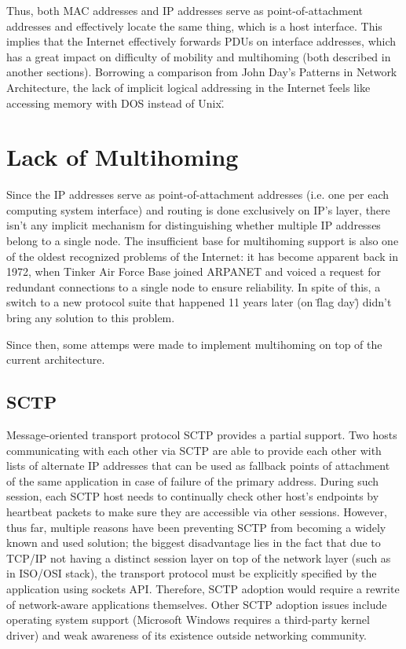         Thus, both MAC addresses and IP addresses serve as point-of-attachment addresses and effectively locate the same thing, which is a host interface. This implies that the Internet effectively forwards PDUs on interface addresses, which has a great impact on difficulty of mobility and multihoming (both described in another sections). Borrowing a comparison from John Day's Patterns in Network Architecture, the lack of implicit logical addressing in the Internet \"feels like accessing memory with DOS instead of Unix\".

    \section{Lack of Multihoming}

        Since the IP addresses serve as point-of-attachment addresses (i.e. one per each computing system interface) and routing is done exclusively on IP's layer, there isn't any implicit mechanism for distinguishing whether multiple IP addresses belong to a single node. The insufficient base for multihoming support is also one of the oldest recognized problems of the Internet: it has become apparent back in 1972, when Tinker Air Force Base joined ARPANET and voiced a request for redundant connections to a single node to ensure reliability. In spite of this, a switch to a new protocol suite that happened 11 years later (on \"flag day\") didn't bring any solution to this problem.

        Since then, some attemps were made to implement multihoming on top of the current architecture.

        \subsection{SCTP}
        Message-oriented transport protocol SCTP provides a partial support. Two hosts communicating with each other via SCTP are able to provide each other with lists of alternate IP addresses that can be used as fallback points of attachment of the same application in case of failure of the primary address. During such session, each SCTP host needs to continually check other host's endpoints by heartbeat packets to make sure they are accessible via other sessions. However, thus far, multiple reasons have been preventing SCTP from becoming a widely known and used solution; the biggest disadvantage lies in the fact that due to TCP/IP not having a distinct session layer on top of the network layer (such as in ISO/OSI stack), the transport protocol must be explicitly specified by the application using sockets API. Therefore, SCTP adoption would require a rewrite of network-aware applications themselves. Other SCTP adoption issues include operating system support (Microsoft Windows requires a third-party kernel driver) and weak awareness of its existence outside networking community.

